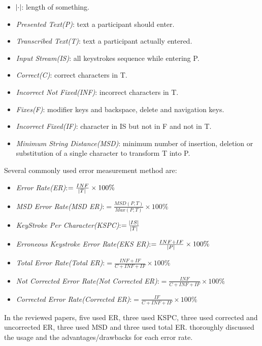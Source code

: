 \documentclass[11pt]{article}
\begin{document}
\begin{itemize}
    \item $\abs{\cdot}$: length of something.
    \item \textit{Presented Text(P)}: text a participant should enter.
    \item \textit{Transcribed Text(T)}: text a participant actually entered.
    \item \textit{Input Stream(IS)}: all keystrokes sequence while entering P.
    \item \textit{Correct(C)}: correct characters in T.
    \item \textit{Incorrect Not Fixed(INF)}: incorrect characters in T.
    \item \textit{Fixes(F)}: modifier keys and backspace, delete and navigation keys.
    \item \textit{Incorrect Fixed(IF)}: character in IS but not in F and not in T.
    \item \textit{Minimum String Distance(MSD)}: minimum number of insertion, deletion or substitution of a single character to transform T into P.

\end{itemize}

Several commonly used error measurement method are:

\begin{itemize}
    \item \textit{Error Rate(ER)}:$=\frac{INF}{\abs{T}}\times 100\%$
    \item \textit{MSD Error Rate(MSD ER)}:$=\frac{MSD(P,T)}{Max(P,T)}\times 100\%$
    \item \textit{KeyStroke Per Character(KSPC)}:$=\frac{\abs{IS}}{\abs{T}}$
    \item \textit{Erroneous Keystroke Error Rate(EKS ER)}:$=\frac{INF+IF}{\abs{P}}\times 100\%$
    \item \textit{Total Error Rate(Total ER)}:$=\frac{INF+IF}{C+INF+IF}\times 100\%$
    \item \textit{Not Corrected Error Rate(Not Corrected ER)}:$=\frac{INF}{C+INF+IF}\times 100\%$
    \item \textit{Corrected Error Rate(Corrected ER)}:$=\frac{IF}{C+INF+IF}\times 100\%$
\end{itemize}

In the reviewed papers, five used ER, three used KSPC, three used corrected and uncorrected ER, three used MSD and three used total ER. \citet{10.1145/642611.642632, 10.5555/1970759, 54444533} thoroughly discussed the usage and the advantages/drawbacks for each error rate.
\end{document}
